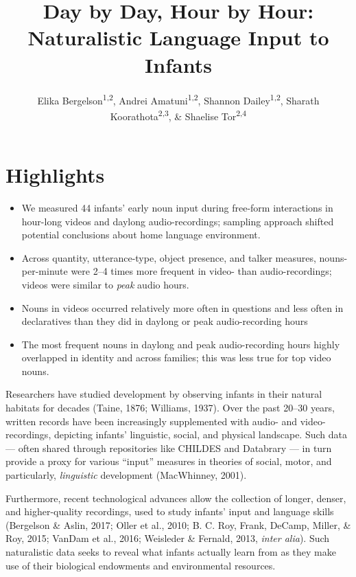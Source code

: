 \documentclass[man]{apa6}
\title{Day by Day, Hour by Hour: Naturalistic Language Input to Infants}
\author{Elika Bergelson\textsuperscript{1,2}, Andrei Amatuni\textsuperscript{1,2}, Shannon Dailey\textsuperscript{1,2}, Sharath Koorathota\textsuperscript{2,3}, \& Shaelise Tor\textsuperscript{2,4}}
\affiliation{
    \vspace{0.5cm}
          \textsuperscript{1} Duke University\\
          \textsuperscript{2} University of Rochester\\
          \textsuperscript{3} Columbia University Medical Center\\
          \textsuperscript{4} Syracuse University  }
\providecommand{\tightlist}{%
  \setlength{\itemsep}{0pt}\setlength{\parskip}{0pt}}
\theoremstyle{definition}
\theoremstyle{definition}
\theoremstyle{definition}
\theoremstyle{remark}
\begin{document}
\maketitle

\setcounter{secnumdepth}{0}



\section{Highlights}\label{highlights}

\begin{itemize}
\tightlist
\item
  We measured 44 infants' early noun input during free-form interactions
  in hour-long videos and daylong audio-recordings; sampling approach
  shifted potential conclusions about home language environment.
\item
  Across quantity, utterance-type, object presence, and talker measures,
  nouns-per-minute were 2--4 times more frequent in video- than
  audio-recordings; videos were similar to \emph{peak} audio hours.
\item
  Nouns in videos occurred relatively more often in questions and less
  often in declaratives than they did in daylong or peak audio-recording
  hours
\item
  The most frequent nouns in daylong and peak audio-recording hours
  highly overlapped in identity and across families; this was less true
  for top video nouns.
\end{itemize}

Researchers have studied development by observing infants in their
natural habitats for decades (Taine, 1876; Williams, 1937). Over the
past 20--30 years, written records have been increasingly supplemented
with audio- and video-recordings, depicting infants' linguistic, social,
and physical landscape. Such data --- often shared through repositories
like CHILDES and Databrary --- in turn provide a proxy for various
\enquote{input} measures in theories of social, motor, and particularly,
\emph{linguistic} development (MacWhinney, 2001).

Furthermore, recent technological advances allow the collection of
longer, denser, and higher-quality recordings, used to study infants'
input and language skills (Bergelson \& Aslin, 2017; Oller et al., 2010;
B. C. Roy, Frank, DeCamp, Miller, \& Roy, 2015; VanDam et al., 2016;
Weisleder \& Fernald, 2013, \emph{inter alia}). Such naturalistic data
seeks to reveal what infants actually learn from as they make use of
their biological endowments and environmental resources.
\end{document}
